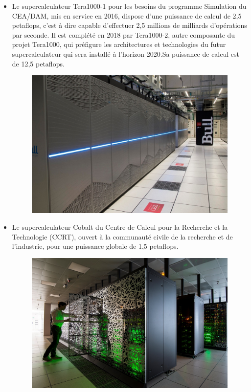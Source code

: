 \documentclass[12pt,a4paper,twoside]{article}
\begin{document}
    \begin{itemize}[label=\textbullet]
        \item
        Le supercalculateur Tera1000-1 pour les besoins du programme Simulation du CEA/DAM, mis en service en 2016, dispose d’une puissance de calcul de 2,5 petaflops, c’est à dire capable d’effectuer 2,5 millions de milliards d’opérations par seconde. Il est complété en 2018 par Tera1000-2, autre composante du projet Tera1000, qui préfigure les architectures et technologies du futur supercalculateur qui sera installé à l’horizon 2020.Sa puissance de calcul est de 12,5 petaflops.

        \begin{figure}[H]
            \centering
            \includegraphics[scale=1]{ressources/images/dam/tera1000.jpg}
        \end{figure}

        \item
        Le supercalculateur Cobalt du Centre de Calcul pour la Recherche et la Technologie (CCRT), ouvert à la communauté civile de la recherche et de l’industrie, pour une puissance globale de 1,5 petaflops.
        \begin{figure}[H]
            \centering
            \includegraphics[scale=1]{ressources/images/dam/cobalt.jpg}
        \end{figure}


\end{itemize}
\end{document}
